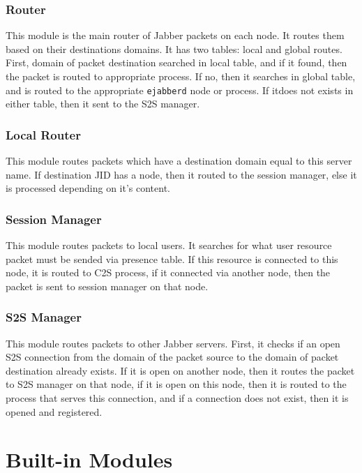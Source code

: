 \documentclass[10pt]{article}
\newcommand{\ejabberd}{\texttt{ejabberd}}
\newcommand{\Jabber}{Jabber}
\begin{document}
\subsubsection{Router}

This module is the main router of \Jabber{} packets on each node.  It routes
them based on their destinations domains.  It has two tables: local and global
routes.  First, domain of packet destination searched in local table, and if it
found, then the packet is routed to appropriate process.  If no, then it
searches in global table, and is routed to the appropriate \ejabberd{} node or
process.  If itdoes not exists in either table, then it sent to the S2S
manager.


\subsubsection{Local Router}

This module routes packets which have a destination domain equal to this server
name.  If destination JID has a node, then it routed to the session manager,
else it is processed depending on it's content.


\subsubsection{Session Manager}

This module routes packets to local users.  It searches for what user resource
packet must be sended via presence table.  If this resource is connected to
this node, it is routed to C2S process, if it connected via another node, then
the packet is sent to session manager on that node.


\subsubsection{S2S Manager}

This module routes packets to other \Jabber{} servers.  First, it checks if an
open S2S connection from the domain of the packet source to the domain of
packet destination already exists. If it is open on another node, then it
routes the packet to S2S manager on that node, if it is open on this node, then
it is routed to the process that serves this connection, and if a connection
does not exist, then it is opened and registered.



\appendix{}

\section{Built-in Modules}
\label{sec:modules}
\end{document}
